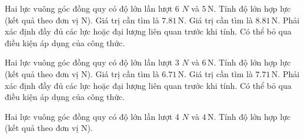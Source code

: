 \begin{ex}
Hai lực vuông góc đồng quy có độ lớn lần lượt 6 $N$ và $5\,\text{N}$. Tính độ lớn hợp lực (kết quả theo đơn vị N).
\choiceTF
{\True Giá trị cần tìm là $7.81\,\text{N}$.}
{Giá trị cần tìm là $8.81\,\text{N}$.}
{\True Phải xác định đầy đủ các lực hoặc đại lượng liên quan trước khi tính.}
{Có thể bỏ qua điều kiện áp dụng của công thức.}
\end{ex}

\begin{ex}
Hai lực vuông góc đồng quy có độ lớn lần lượt 3 $N$ và $6\,\text{N}$. Tính độ lớn hợp lực (kết quả theo đơn vị N).
\choiceTF
{\True Giá trị cần tìm là $6.71\,\text{N}$.}
{Giá trị cần tìm là $7.71\,\text{N}$.}
{\True Phải xác định đầy đủ các lực hoặc đại lượng liên quan trước khi tính.}
{Có thể bỏ qua điều kiện áp dụng của công thức.}
\end{ex}

\begin{ex}
Hai lực vuông góc đồng quy có độ lớn lần lượt 4 $N$ và $4\,\text{N}$. Tính độ lớn hợp lực (kết quả theo đơn vị N).
\end{ex}

